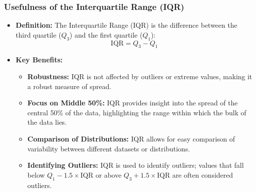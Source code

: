 \documentclass[handout]{beamer} %
\begin{document}
\begin{frame}
\frametitle{Usefulness of the Interquartile Range (IQR)}

\begin{itemize}
    \item \textbf{Definition:} The Interquartile Range (IQR) is the difference between the third quartile (\(Q_3\)) and the first quartile (\(Q_1\)):
    \[
    \text{IQR} = Q_3 - Q_1
    \]
    \item \textbf{Key Benefits:}
    \begin{itemize}
        \item \textbf{Robustness:} IQR is not affected by outliers or extreme values, making it a robust measure of spread.
        \item \textbf{Focus on Middle 50\%:} IQR provides insight into the spread of the central 50\% of the data, highlighting the range within which the bulk of the data lies.
        \item \textbf{Comparison of Distributions:} IQR allows for easy comparison of variability between different datasets or distributions.
        \item \textbf{Identifying Outliers:} IQR is used to identify outliers; values that fall below \(Q_1 - 1.5 \times \text{IQR}\) or above \(Q_3 + 1.5 \times \text{IQR}\) are often considered outliers.
    \end{itemize}
\end{itemize}

\end{frame}
\end{document}
